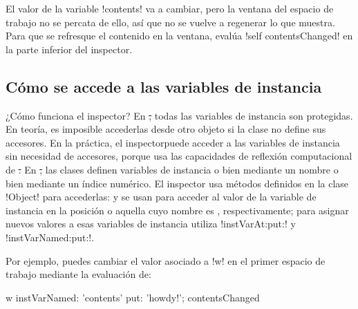 \documentclass[a4paper,10pt,twoside]{book}
\begin{document}
  El valor de la variable \ct!contents! va a
cambiar, pero la ventana del espacio de trabajo no se percata de ello,
así que no se vuelve a regenerar lo que muestra.  Para que se
refresque el contenido en la ventana, evalúa \ct!self contentsChanged!
en la parte inferior del inspector.

\subsection{Cómo se accede a las variables de instancia}


¿Cómo funciona el inspector?  En \st, todas las variables de instancia
son protegidas.  En teoría, es imposible accederlas desde otro objeto
si la clase no define sus accesores.  En la práctica, el
inspectorpuede acceder a las variables de instancia sin necesidad de
accesores, porque usa las capacidades de reflexión computacional de
\st.  En \st, las clases definen variables de instancia o bien
mediante un nombre o bien mediante un índice numérico.  El inspector
usa métodos definidos en la clase \ct!Object! para accederlas:
 y  se
usan para acceder al valor de la variable de instancia en la posición
 o aquella cuyo nombre es ,
respectivamente; para asignar nuevos valores a esas variables de
instancia utiliza \ct!instVarAt:put:! y \ct!instVarNamed:put:!.
 
 

Por ejemplo, puedes cambiar el valor asociado a \ct!w! en el primer
espacio de trabajo mediante la evaluación de:
\begin{code}{}
w instVarNamed: 'contents' put: 'howdy!'; contentsChanged
\end{code}

\end{document}
